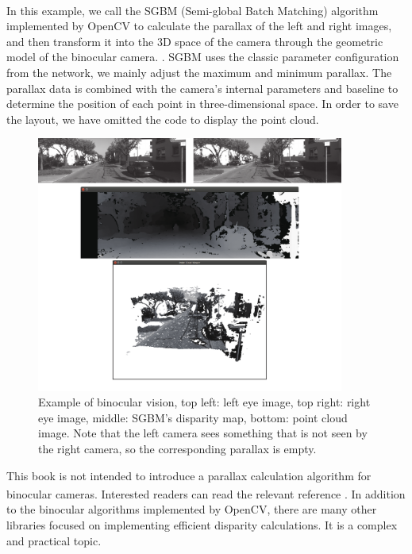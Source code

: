 In this example, we call the SGBM (Semi-global Batch Matching)\textsuperscript{\cite{Hirschmuller2008}} algorithm implemented by OpenCV to calculate the parallax of the left and right images, and then transform it into the 3D space of the camera through the geometric model of the binocular camera. . SGBM uses the classic parameter configuration from the network, we mainly adjust the maximum and minimum parallax. The parallax data is combined with the camera's internal parameters and baseline to determine the position of each point in three-dimensional space. In order to save the layout, we have omitted the code to display the point cloud.

\begin{figure}[!t]
    \centering
    \includegraphics[width=0.9\textwidth]{chapter05/resources/cameraModel/stereoExample.pdf}
    \caption{Example of binocular vision, top left: left eye image, top right: right eye image, middle: SGBM's disparity map, bottom: point cloud image. Note that the left camera sees something that is not seen by the right camera, so the corresponding parallax is empty. }
    \label{fig:stereoExample}
\end{figure}

This book is not intended to introduce a parallax calculation algorithm for binocular cameras. Interested readers can read the relevant reference \textsuperscript{\cite{Scharstein2002, Seitz2006}}. In addition to the binocular algorithms implemented by OpenCV, there are many other libraries focused on implementing efficient disparity calculations. It is a complex and practical topic.